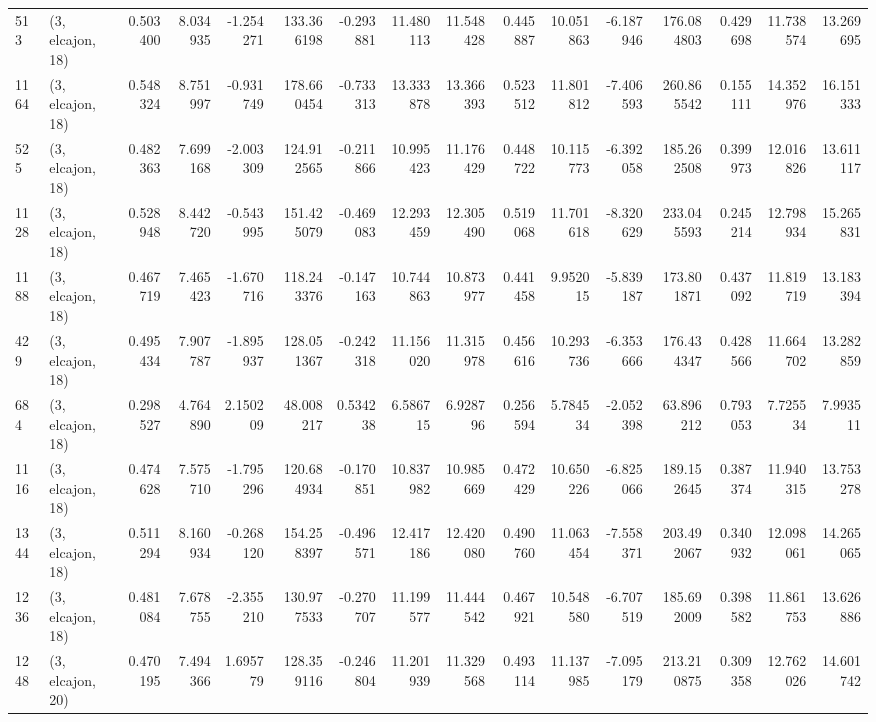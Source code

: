 \begin{tabular}{llrrrrrrrrrrrrrr}
513  &  (3, elcajon, 18) &   0.503400 &   8.034935 &  -1.254271 &    133.366198 &   -0.293881 &   11.480113 &   11.548428 &  0.445887 &  10.051863 &  -6.187946 &   176.084803 &   0.429698 &  11.738574 &  13.269695 \\
1164 &  (3, elcajon, 18) &   0.548324 &   8.751997 &  -0.931749 &    178.660454 &   -0.733313 &   13.333878 &   13.366393 &  0.523512 &  11.801812 &  -7.406593 &   260.865542 &   0.155111 &  14.352976 &  16.151333 \\
525  &  (3, elcajon, 18) &   0.482363 &   7.699168 &  -2.003309 &    124.912565 &   -0.211866 &   10.995423 &   11.176429 &  0.448722 &  10.115773 &  -6.392058 &   185.262508 &   0.399973 &  12.016826 &  13.611117 \\
1128 &  (3, elcajon, 18) &   0.528948 &   8.442720 &  -0.543995 &    151.425079 &   -0.469083 &   12.293459 &   12.305490 &  0.519068 &  11.701618 &  -8.320629 &   233.045593 &   0.245214 &  12.798934 &  15.265831 \\
1188 &  (3, elcajon, 18) &   0.467719 &   7.465423 &  -1.670716 &    118.243376 &   -0.147163 &   10.744863 &   10.873977 &  0.441458 &   9.952015 &  -5.839187 &   173.801871 &   0.437092 &  11.819719 &  13.183394 \\
429  &  (3, elcajon, 18) &   0.495434 &   7.907787 &  -1.895937 &    128.051367 &   -0.242318 &   11.156020 &   11.315978 &  0.456616 &  10.293736 &  -6.353666 &   176.434347 &   0.428566 &  11.664702 &  13.282859 \\
684  &  (3, elcajon, 18) &   0.298527 &   4.764890 &   2.150209 &     48.008217 &    0.534238 &    6.586715 &    6.928796 &  0.256594 &   5.784534 &  -2.052398 &    63.896212 &   0.793053 &   7.725534 &   7.993511 \\
1116 &  (3, elcajon, 18) &   0.474628 &   7.575710 &  -1.795296 &    120.684934 &   -0.170851 &   10.837982 &   10.985669 &  0.472429 &  10.650226 &  -6.825066 &   189.152645 &   0.387374 &  11.940315 &  13.753278 \\
1344 &  (3, elcajon, 18) &   0.511294 &   8.160934 &  -0.268120 &    154.258397 &   -0.496571 &   12.417186 &   12.420080 &  0.490760 &  11.063454 &  -7.558371 &   203.492067 &   0.340932 &  12.098061 &  14.265065 \\
1236 &  (3, elcajon, 18) &   0.481084 &   7.678755 &  -2.355210 &    130.977533 &   -0.270707 &   11.199577 &   11.444542 &  0.467921 &  10.548580 &  -6.707519 &   185.692009 &   0.398582 &  11.861753 &  13.626886 \\
1248 &  (3, elcajon, 20) &   0.470195 &   7.494366 &   1.695779 &    128.359116 &   -0.246804 &   11.201939 &   11.329568 &  0.493114 &  11.137985 &  -7.095179 &   213.210875 &   0.309358 &  12.762026 &  14.601742 \\

\end{tabular}
